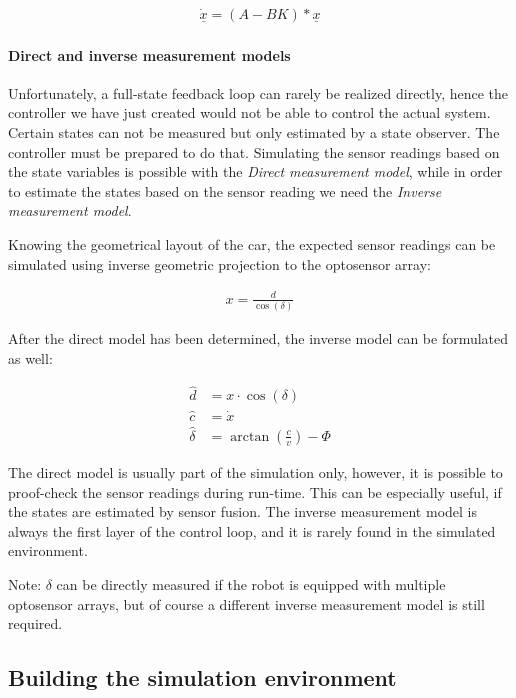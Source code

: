 \begin{align}
	\underline{\dot{x}} = (A - BK)*\underline{x}
\end{align}

\paragraph{Direct and inverse measurement models}

Unfortunately, a full-state feedback loop can rarely be realized directly, hence the controller we have just created would not be able to control the actual system. Certain states can not be measured but only estimated by a state observer. The controller must be prepared to do that. Simulating the sensor readings based on the state variables is possible with the \emph{Direct measurement model}, while in order to estimate the states based on the sensor reading we need the \emph{Inverse measurement model}.

Knowing the geometrical layout of the car, the expected sensor readings can be simulated using inverse geometric projection to the optosensor array:

\begin{align}
    x = \frac{d}{\cos(\delta)}
\end{align}

After the direct model has been determined, the inverse model can be formulated as well:

\begin{align}
    \hat{d} &= x \cdot \cos(\delta) \\
    \hat{c} &=\dot{x} \\
    \hat{\delta} &= \arctan \left(\frac{c}{v}\right) - \Phi
\end{align}

The direct model is usually part of the simulation only, however, it is possible to proof-check the sensor readings during run-time. This can be especially useful, if the states are estimated by sensor fusion. The inverse measurement model is always the first layer of the control loop, and it is rarely found in the simulated environment.

Note: $\delta$ can be directly measured if the robot is equipped with multiple optosensor arrays, but of course a different inverse measurement model is still required.

\subsection{Building the simulation environment}


